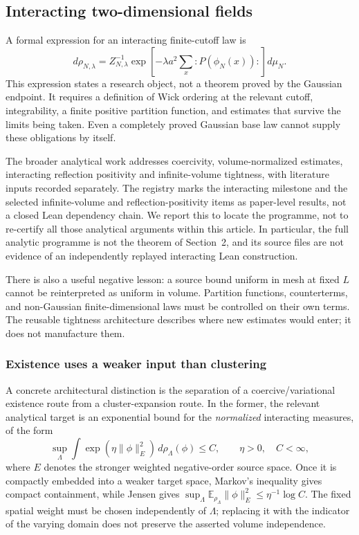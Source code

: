 \documentclass[11pt]{amsart}
\theoremstyle{remark}\newtheorem{remark}[theorem]{Remark}
\newcommand{\E}{\mathbb E}\newcommand{\HH}{\mathcal H_{-s}^{\mathrm{Fourier}}}
\begin{document}
\subsection{Interacting two-dimensional fields}
A formal expression for an interacting finite-cutoff law is
\[
 d\rho_{N,\lambda}=Z_{N,\lambda}^{-1}\exp\left[-\lambda a^2\sum_x:P(\phi_N(x)):\right]d\mu_N.
\]
This expression states a research object, not a theorem proved by the Gaussian endpoint. It requires a definition of Wick ordering at the relevant cutoff, integrability, a finite positive partition function, and estimates that survive the limits being taken. Even a completely proved Gaussian base law cannot supply these obligations by itself.

The broader analytical work addresses coercivity, volume-normalized estimates, interacting reflection positivity and infinite-volume tightness, with literature inputs recorded separately. The registry marks the interacting milestone and the selected infinite-volume and reflection-positivity items as paper-level results, not a closed Lean dependency chain. We report this to locate the programme, not to re-certify all those analytical arguments within this article. In particular, the full analytic programme is not the theorem of Section~2, and its source files are not evidence of an independently replayed interacting Lean construction.

There is also a useful negative lesson: a source bound uniform in mesh at fixed $L$ cannot be reinterpreted as uniform in volume. Partition functions, counterterms, and non-Gaussian finite-dimensional laws must be controlled on their own terms. The reusable tightness architecture describes where new estimates would enter; it does not manufacture them.

\subsubsection{Existence uses a weaker input than clustering}
A concrete architectural distinction is the separation of a coercive/variational existence route from a cluster-expansion route. In the former, the relevant analytical target is an exponential bound for the \emph{normalized} interacting measures, of the form
\begin{equation}\label{eq:interacting-exponential}
 \sup_{\Lambda}\int \exp(\eta\|\phi\|_E^2)\,d\rho_\Lambda(\phi)\le C,
 \qquad \eta>0,\quad C<\infty,
\end{equation}
where $E$ denotes the stronger weighted negative-order source space. Once it is compactly embedded into a weaker target space, Markov's inequality gives compact containment, while Jensen gives
$\sup_\Lambda\E_{\rho_\Lambda}\|\phi\|_E^2\le\eta^{-1}\log C$.
The fixed spatial weight must be chosen independently of $\Lambda$; replacing it with the indicator of the varying domain does not preserve the asserted volume independence.
\end{document}
